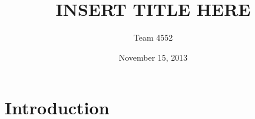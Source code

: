 \documentclass[12pt]{article}
\title{\textbf{INSERT TITLE HERE}}
\author{Team 4552}
\date{November 15, 2013}
\begin{document}
\maketitle
\newpage
\begin{abstract}
\end{abstract}

\section{Introduction}


\end{document}
